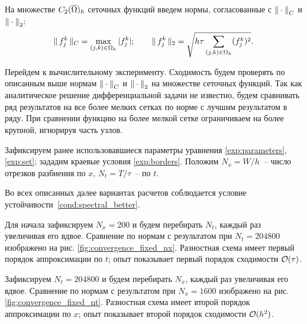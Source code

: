 На множестве $C_2({\overline{\Omega}})_h$ сеточных функций введем нормы, согласованные с ${\| \cdot \|}_C$ и ${\| \cdot \|}_2$:
$$\| \, f_j^k \, \|_C = \max \limits_{(j, k) \in \Omega_h} |f_j^k|; \qquad \| \, f_j^k \, \|_2 = \sqrt{h \tau \sum \limits_{(j, k) \in \Omega_h} (f_j^k)^2} {\text{.}}$$

Перейдем к вычислительному эксперименту. Сходимость будем проверять по описанным выше нормам ${\| \cdot \|}_C$ и ${\| \cdot \|}_2$ на множестве сеточных функций. Так как аналитическое решение дифференциальной задачи не известно, будем сравнивать ряд результатов на все более мелких сетках по норме с лучшим результатом в ряду. При сравнении функцию на более мелкой сетке ограничиваем на более крупной, игнорируя часть узлов.

Зафиксируем ранее использовавшиеся параметры уравнения \eqref{exp:parameters}, \eqref{exp:set}; зададим краевые условия \eqref{exp:borders}. Положим $N_x = W / h$~-- число отрезков разбиения по $x$, $N_t = T / \tau$~-- по $t$.

Во всех описанных далее вариантах расчетов соблюдается условие устойчивости~\eqref{cond:spectral_better}.

Для начала зафиксируем $N_x = 200$ и будем перебирать $N_t$, каждый раз увеличивая его вдвое. Сравнение по нормам с результатом при $N_t = 204800$ изображено на рис. \ref{fig:convergence_fixed_nx}. Разностная схема имеет первый порядок аппроксимации по $t$; опыт показывает первый порядок сходимости ${\mathcal{O}} (\tau)$.

Зафиксируем $N_t = 204800$ и будем перебирать $N_x$, каждый раз увеличивая его вдвое. Сравнение по нормам с результатом при $N_x = 1600$ изображено на рис. \ref{fig:convergence_fixed_nt}. Разностная схема имеет второй порядок аппроксимации по $x$; опыт показывает второй порядок сходимости ${\mathcal{O}} (h^2)$.

